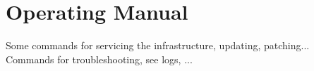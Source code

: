 \section{Operating Manual}
Some commands for servicing the infrastructure, updating, patching... \\

\noindent Commands for troubleshooting, see logs, ...
